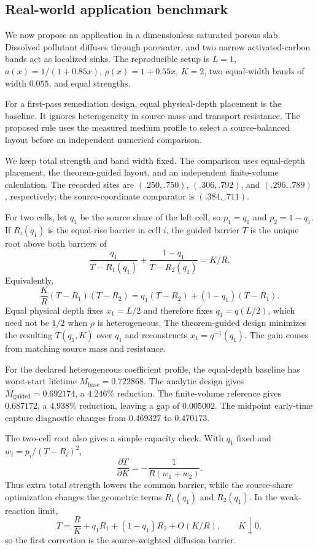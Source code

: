 \documentclass[10pt]{article}
\begin{document}
\subsection{Real-world application benchmark}

We now propose an application in a dimensionless saturated porous slab. Dissolved pollutant diffuses through porewater, and two narrow activated-carbon bands act as localized sinks. The reproducible setup is $L=1$, $a(x)=1/(1+0.85x)$, $\rho(x)=1+0.55x$, $K=2$, two equal-width bands of width $0.055$, and equal strengths.

For a first-pass remediation design, equal physical-depth placement is the baseline. It ignores heterogeneity in source mass and transport resistance. The proposed rule uses the measured medium profile to select a source-balanced layout before an independent numerical comparison.

We keep total strength and band width fixed. The comparison uses equal-depth placement, the theorem-guided layout, and an independent finite-volume calculation. The recorded sites are $(.250,.750)$, $(.306,.792)$, and $(.296,.789)$, respectively; the source-coordinate comparator is $(.384,.711)$.

For two cells, let $q_1$ be the source share of the left cell, so $p_1=q_1$ and $p_2=1-q_1$. If $R_i(q_1)$ is the equal-rise barrier in cell $i$, the guided barrier $T$ is the unique root above both barriers of
\[
\frac{q_1}{T-R_1(q_1)}
+\frac{1-q_1}{T-R_2(q_1)}=K/R.
\]
Equivalently,
\[
\frac{K}{R}(T-R_1)(T-R_2)=q_1(T-R_2)+(1-q_1)(T-R_1).
\]
Equal physical depth fixes $x_1=L/2$ and therefore fixes $q_1=q(L/2)$, which need not be $1/2$ when $\rho$ is heterogeneous. The theorem-guided design minimizes the resulting $T(q_1,K)$ over $q_1$ and reconstructs $x_1=q^{-1}(q_1)$. The gain comes from matching source mass and resistance.

For the declared heterogeneous coefficient profile, the equal-depth baseline has worst-start lifetime $M_{\mathrm{base}}=0.722868$. The analytic design gives $M_{\mathrm{guided}}=0.692174$, a $4.246\%$ reduction. The finite-volume reference gives $0.687172$, a $4.938\%$ reduction, leaving a gap of $0.005002$. The midpoint early-time capture diagnostic changes from $0.469327$ to $0.470173$.

The two-cell root also gives a simple capacity check. With $q_1$ fixed and $w_i=p_i/(T-R_i)^2$,
\[
\frac{\partial T}{\partial K}=-\frac{1}{R(w_1+w_2)}.
\]
Thus extra total strength lowers the common barrier, while the source-share optimization changes the geometric terms $R_1(q_1)$ and $R_2(q_1)$. In the weak-reaction limit,
\[
T=\frac{R}{K}+q_1R_1+(1-q_1)R_2+O(K/R),
\qquad K\downarrow0,
\]
so the first correction is the source-weighted diffusion barrier.
\end{document}
